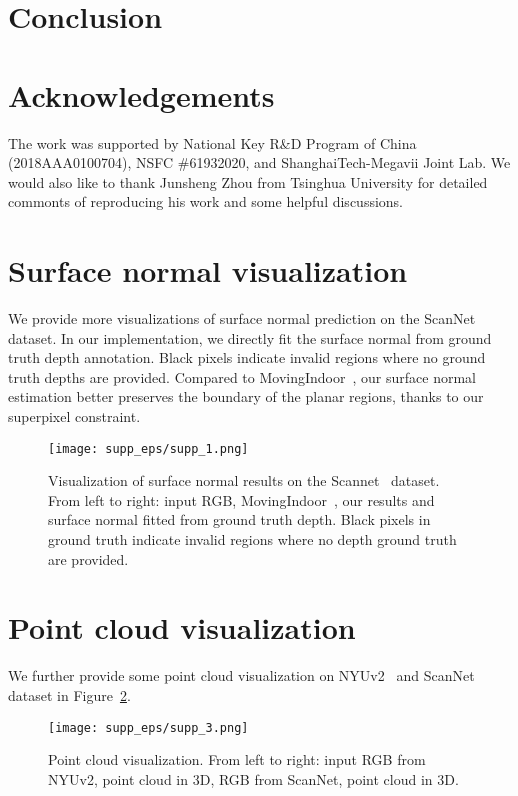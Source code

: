 \documentclass[runningheads]{llncs}
\begin{document}
\section{Conclusion}


\section*{Acknowledgements}
The work was supported by National Key R\&D Program of China (2018AAA0100704), NSFC \#61932020,
and ShanghaiTech-Megavii Joint Lab. We would also like to thank Junsheng Zhou from Tsinghua University for detailed commonts of reproducing his work and some helpful discussions.

\clearpage
\appendix
\begin{appendix}
\section{Surface normal visualization}
We provide more visualizations of surface normal prediction on the ScanNet~\cite{dai2017scannet} dataset. In our implementation, we directly fit the surface normal from ground truth depth annotation. Black pixels indicate invalid regions where no ground truth depths are provided. Compared to MovingIndoor~\cite{zhou2019moving}, our surface normal estimation better preserves the boundary of the planar regions, thanks to our superpixel constraint. 


\begin{figure}[!t]
    \centering
    \texttt{[image: supp\_eps/supp\_1.png]}
    \caption{Visualization of surface normal results on the Scannet~\cite{dai2017scannet} dataset. From left to right: input RGB, MovingIndoor~\cite{zhou2019moving}, our results and surface normal fitted from ground truth depth. Black pixels in ground truth indicate invalid regions where no depth ground truth are provided.}
    \label{fig:scannet_norm}
\end{figure}



\section{Point cloud visualization}
We further provide some point cloud visualization on NYUv2~\cite{nyu} and ScanNet~\cite{dai2017scannet} dataset in Figure~\ref{fig:pointcloud}.

\begin{figure}[!htbp]
    \centering
    \texttt{[image: supp\_eps/supp\_3.png]}
    \caption{Point cloud visualization. From left to right: input RGB from NYUv2, point cloud in 3D, RGB from ScanNet, point cloud in 3D.}
    \label{fig:pointcloud}
\end{figure}



\end{appendix}
\end{document}
